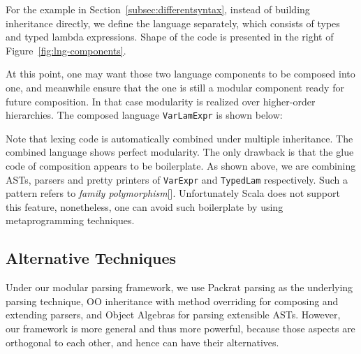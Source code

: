 For the example in Section~\ref{subsec:differentsyntax}, instead of building inheritance directly, we define the language separately,
which consists of types and typed lambda expressions. Shape of the code is presented in the right of Figure~\ref{fig:lng-components}.

At this point, one may want those two language components to be composed into one, and meanwhile ensure that the one is still a modular
component ready for future composition. In that case modularity is realized over higher-order hierarchies. The composed language \lstinline{VarLamExpr}
is shown below:

Note that lexing code is automatically combined under multiple inheritance. The combined language shows perfect modularity. The only
drawback is that the glue code of composition appears to be boilerplate. As shown above, we are combining ASTs, parsers and pretty printers of
\lstinline{VarExpr} and \lstinline{TypedLam} respectively. Such a pattern refers to \textit{family polymorphism}[]. Unfortunately Scala does not
support this feature, nonetheless, one can avoid such boilerplate by using metaprogramming techniques.

\subsection{Alternative Techniques}
Under our modular parsing framework, we use Packrat parsing as the underlying parsing technique, OO inheritance with method overriding for composing and extending parsers, and Object Algebras for parsing extensible ASTs. However, our framework is more general and thus more powerful, because those aspects are orthogonal to each other, and hence can have their alternatives.

